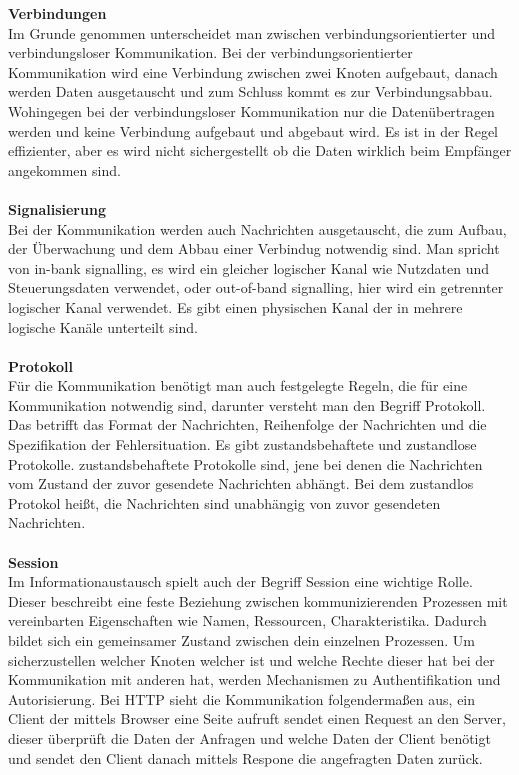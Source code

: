 \documentclass[a4paper,12pt]{article}
\begin{document}
\newpage
\noindent
\textbf{Verbindungen\\}
Im Grunde genommen unterscheidet man zwischen verbindungsorientierter und verbindungsloser Kommunikation. Bei der verbindungsorientierter Kommunikation wird eine Verbindung zwischen zwei Knoten aufgebaut, danach werden Daten ausgetauscht und zum Schluss kommt es zur
Verbindungsabbau. Wohingegen bei der verbindungsloser Kommunikation nur die Datenübertragen werden und keine Verbindung aufgebaut und abgebaut wird. Es ist in der Regel effizienter, aber es wird nicht sichergestellt ob die Daten wirklich beim Empfänger angekommen sind.\\ \\
\textbf{Signalisierung\\}
Bei der Kommunikation werden auch Nachrichten ausgetauscht, die zum Aufbau, der Überwachung und dem Abbau einer Verbindug notwendig sind. Man spricht von in-bank signalling, es wird ein gleicher logischer Kanal wie Nutzdaten und Steuerungsdaten verwendet, oder out-of-band signalling, hier wird ein getrennter logischer Kanal verwendet. Es gibt einen
physischen Kanal der in mehrere logische Kanäle unterteilt sind. \\ \\
\textbf{Protokoll\\}
Für die Kommunikation benötigt man auch festgelegte Regeln, die für eine Kommunikation notwendig sind, darunter versteht man den Begriff Protokoll. Das betrifft das Format der Nachrichten, Reihenfolge der Nachrichten und die Spezifikation der Fehlersituation. Es gibt zustandsbehaftete und zustandlose Protokolle. zustandsbehaftete Protokolle sind, jene bei denen die Nachrichten
vom Zustand der zuvor gesendete Nachrichten abhängt. Bei dem zustandlos Protokol heißt, die Nachrichten sind unabhängig von zuvor gesendeten Nachrichten.\\\\
\textbf{Session\\}
Im Informationaustausch spielt auch der Begriff Session eine wichtige Rolle. Dieser beschreibt eine feste Beziehung zwischen kommunizierenden Prozessen mit vereinbarten Eigenschaften wie Namen, Ressourcen, Charakteristika. Dadurch bildet sich ein gemeinsamer Zustand zwischen dein einzelnen Prozessen. Um sicherzustellen welcher Knoten welcher ist und welche Rechte dieser hat 
bei der Kommunikation mit anderen hat, werden Mechanismen zu Authentifikation und Autorisierung. Bei HTTP sieht die Kommunikation folgendermaßen aus, ein Client der mittels Browser eine Seite aufruft sendet einen Request an den Server, dieser überprüft die Daten der Anfragen und welche Daten der Client benötigt und sendet den Client danach mittels Respone die angefragten Daten zurück.\\
\end{document}
